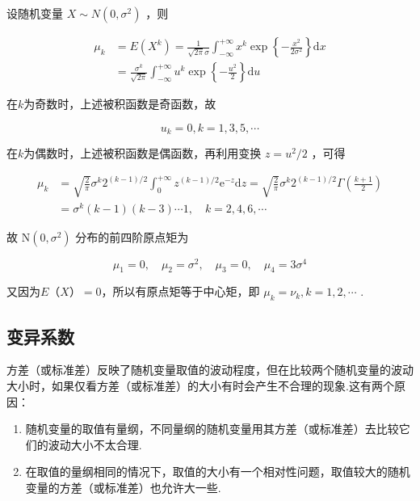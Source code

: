 \begin{example}
	设随机变量 $X \sim N\left(0, \sigma^{2}\right)$ ，则
	
	\[
	\begin{aligned} 
	\mu_{k} &=E\left(X^{k}\right)=\frac{1}{\sqrt{2 \pi} \sigma} \int_{-\infty}^{+\infty} x^{k} \exp \left\{-\frac{x^{2}}{2 \sigma^{2}}\right\} \mathrm{d} x \\ 
	&=\frac{\sigma^{k}}{\sqrt{2 \pi}} \int_{-\infty}^{+\infty} u^{k} \exp \left\{-\frac{u^{2}}{2}\right\} \mathrm{d} u 
	\end{aligned}
	\]
	
	在$ k $为奇数时，上述被积函数是奇函数，故
	
	\[
	u_{k}=0, k=1,3,5, \cdots
	\]
	
	在$ k $为偶数时，上述被积函数是偶函数，再利用变换 $z=u^{2} / 2$ ，可得
	
	\[
	\begin{aligned} \mu_{k} &=\sqrt{\frac{2}{\pi}} \sigma^{k} 2^{(k-1) / 2} \int_{0}^{+\infty} z^{(k-1) / 2} \mathrm{e}^{-z} \mathrm{d} z=\sqrt{\frac{2}{\pi}} \sigma^{k} 2^{(k-1) / 2} \Gamma\left(\frac{k+1}{2}\right) \\ &=\sigma^{k}(k-1)(k-3) \cdots 1, \quad k=2,4,6, \cdots \end{aligned}
	\]
	
	故 $\mathrm{N}\left(0, \sigma^{2}\right)$ 分布的前四阶原点矩为
	
	\[
	\mu_{1}=0, \quad \mu_{2}=\sigma^{2}, \quad \mu_{3}=0, \quad \mu_{4}=3 \sigma^{4}
	\]
	
	又因为$ E（X）=0 $，所以有原点矩等于中心矩，即 $\mu_{k}=\nu_{k}, k=1,2, \cdots$ .
\end{example}

\subsection{变异系数}

方差（或标准差）反映了随机变量取值的波动程度，但在比较两个随机变量的波动大小时，如果仅看方差（或标准差）的大小有时会产生不合理的现象.这有两个原因：

\begin{enumerate}
	\item 随机变量的取值有量纲，不同量纲的随机变量用其方差（或标准差）去比较它们的波动大小不太合理.
	\item 在取值的量纲相同的情况下，取值的大小有一个相对性问题，取值较大的随机变量的方差（或标准差）也允许大一些.
\end{enumerate}


